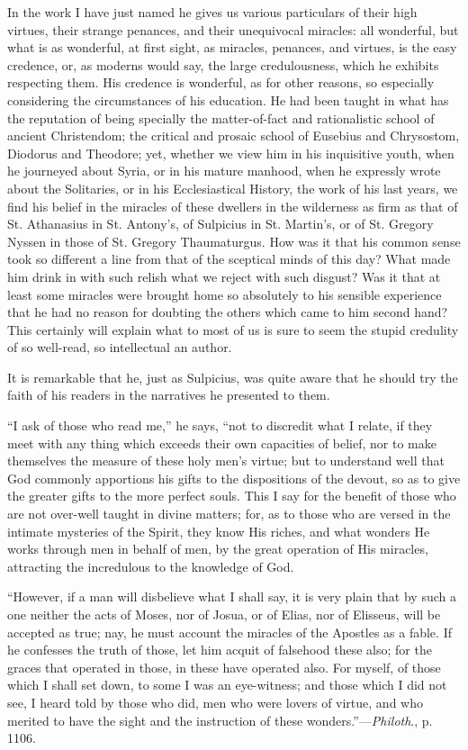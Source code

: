 In the work I have just named he gives us various particulars of
their high virtues, their strange penances, and their unequivocal
miracles: all wonderful, but what is as wonderful, at first sight, as
miracles, penances, and virtues, is the easy credence, or, as moderns
would say, the large credulousness, which he exhibits respecting them.
His credence is wonderful, as for other reasons, so especially
considering the circumstances of his education. He had been taught in
what has the reputation of being specially the matter-of-fact and
rationalistic school of ancient Christendom; the critical and prosaic
school of Eusebius and Chrysostom, Diodorus and Theodore; yet, whether
we view him in his inquisitive youth, when he journeyed about Syria,
or in his mature manhood, when he expressly wrote about the
Solitaries, or in his Ecclesiastical History, the work of his last
years, we find his belief in the miracles of these dwellers in the
wilderness as firm as that of St. Athanasius in St. Antony's, of
Sulpicius in St. Martin's, or of St. Gregory Nyssen in those of St.
Gregory Thaumaturgus. How was it that his common sense took so
different a line from that of the sceptical minds of this day? What
made him drink in with such relish what we reject with such disgust?
Was it that at least some miracles were brought home so absolutely to
his sensible experience that he had no reason for doubting the others
which came to him second hand? This certainly will explain what
to most of us is sure to seem the stupid credulity of so well-read, so
intellectual an author.

It is remarkable that he, just as Sulpicius, was quite aware that
he should try the faith of his readers in the narratives he presented
to them.

``I ask of those who read me,'' he says, ``not to
discredit what I relate, if they meet with any thing which exceeds
their own capacities of belief, nor to make themselves the measure of
these holy men's virtue; but to understand well that God commonly
apportions his gifts to the dispositions of the devout, so as to give
the greater gifts to the more perfect souls. This I say for the
benefit of those who are not over-well taught in divine matters; for,
as to those who are versed in the intimate mysteries of the Spirit,
they know His riches, and what wonders He works through men in behalf
of men, by the great operation of His miracles, attracting the
incredulous to the knowledge of God.

``However, if a man will disbelieve what I shall say, it is
very plain that by such a one neither the acts of Moses, nor of Josua,
or of Elias, nor of Elisseus, will be accepted as true; nay, he must
account the miracles of the Apostles as a fable. If he confesses the
truth of those, let him acquit of falsehood these also; for the graces
that operated in those, in these have operated also. For myself, of
those which I shall set down, to some I was an eye-witness; and those
which I did not see, I heard told by those who did, men who were
lovers of virtue, and who merited to have the sight and the
instruction of these wonders.''—\emph{Philoth}., p. 1106.


